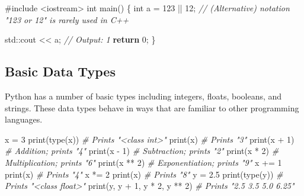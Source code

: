 \documentclass[
]{article}
\newenvironment{Shaded}{}{}
\newcommand{\BuiltInTok}[1]{#1}
\newcommand{\CommentTok}[1]{\textcolor[rgb]{0.38,0.63,0.69}{\textit{#1}}}
\newcommand{\ControlFlowTok}[1]{\textcolor[rgb]{0.00,0.44,0.13}{\textbf{#1}}}
\newcommand{\DataTypeTok}[1]{\textcolor[rgb]{0.56,0.13,0.00}{#1}}
\newcommand{\DecValTok}[1]{\textcolor[rgb]{0.25,0.63,0.44}{#1}}
\newcommand{\FloatTok}[1]{\textcolor[rgb]{0.25,0.63,0.44}{#1}}
\newcommand{\ImportTok}[1]{#1}
\newcommand{\NormalTok}[1]{#1}
\newcommand{\OperatorTok}[1]{\textcolor[rgb]{0.40,0.40,0.40}{#1}}
\newcommand{\PreprocessorTok}[1]{\textcolor[rgb]{0.74,0.48,0.00}{#1}}
\begin{document}
\begin{Shaded}
\begin{Highlighting}[]
\PreprocessorTok{\#include }\ImportTok{\textless{}iostream\textgreater{}}
\DataTypeTok{int}\NormalTok{ main}\OperatorTok{()} \OperatorTok{\{}
  \DataTypeTok{int}\NormalTok{ a }\OperatorTok{=} \DecValTok{123} \OperatorTok{||} \DecValTok{12}\OperatorTok{;}  
  \CommentTok{// (Alternative) notation "123 or 12" is rarely used in C++}

  \BuiltInTok{std::}\NormalTok{cout}\OperatorTok{ \textless{}\textless{}}\NormalTok{ a}\OperatorTok{;}
  \CommentTok{// Output: 1}
  \ControlFlowTok{return} \DecValTok{0}\OperatorTok{;}
\OperatorTok{\}}
\end{Highlighting}
\end{Shaded}

\hypertarget{basic-data-types}{%
\subsection{Basic Data Types}\label{basic-data-types}}

Python has a number of basic types including integers, floats, booleans,
and strings. These data types behave in ways that are familiar to other
programming languages.

\begin{Shaded}
\begin{Highlighting}[]
\NormalTok{x }\OperatorTok{=} \DecValTok{3}
\BuiltInTok{print}\NormalTok{(}\BuiltInTok{type}\NormalTok{(x)) }\CommentTok{\# Prints "\textless{}class \textquotesingle{}int\textquotesingle{}\textgreater{}"}
\BuiltInTok{print}\NormalTok{(x)       }\CommentTok{\# Prints "3"}
\BuiltInTok{print}\NormalTok{(x }\OperatorTok{+} \DecValTok{1}\NormalTok{)   }\CommentTok{\# Addition; prints "4"}
\BuiltInTok{print}\NormalTok{(x }\OperatorTok{{-}} \DecValTok{1}\NormalTok{)   }\CommentTok{\# Subtraction; prints "2"}
\BuiltInTok{print}\NormalTok{(x }\OperatorTok{*} \DecValTok{2}\NormalTok{)   }\CommentTok{\# Multiplication; prints "6"}
\BuiltInTok{print}\NormalTok{(x }\OperatorTok{**} \DecValTok{2}\NormalTok{)  }\CommentTok{\# Exponentiation; prints "9"}
\NormalTok{x }\OperatorTok{+=} \DecValTok{1}
\BuiltInTok{print}\NormalTok{(x)       }\CommentTok{\# Prints "4"}
\NormalTok{x }\OperatorTok{*=} \DecValTok{2}
\BuiltInTok{print}\NormalTok{(x)       }\CommentTok{\# Prints "8"}
\NormalTok{y }\OperatorTok{=} \FloatTok{2.5}
\BuiltInTok{print}\NormalTok{(}\BuiltInTok{type}\NormalTok{(y))                 }\CommentTok{\# Prints "\textless{}class \textquotesingle{}float\textquotesingle{}\textgreater{}"}
\BuiltInTok{print}\NormalTok{(y, y }\OperatorTok{+} \DecValTok{1}\NormalTok{, y }\OperatorTok{*} \DecValTok{2}\NormalTok{, y }\OperatorTok{**} \DecValTok{2}\NormalTok{) }\CommentTok{\# Prints "2.5 3.5 5.0 6.25"}
\end{Highlighting}
\end{Shaded}
\end{document}
